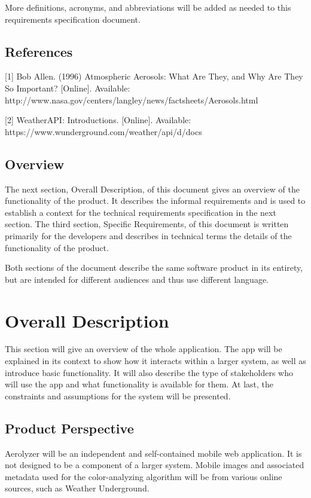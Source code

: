 \documentclass[letterpaper,10pt,draftclsnofoot,onecolumn]{IEEEtran}
\begin{document}
\begin{flushleft}
More definitions, acronyms, and abbreviations will be added as needed to this requirements specification document.
\subsection{References}
[1] Bob Allen. (1996) Atmospheric Aerosols: What Are They, and Why Are They So Important? [Online]. Available: http://www.nasa.gov/centers/langley/news/factsheets/Aerosols.html

[2] WeatherAPI: Introductions. [Online]. Available: https://www.wunderground.com/weather/api/d/docs

\subsection{Overview}
The next section, Overall Description, of this document gives an overview of the functionality of the product.
It describes the informal requirements and is used to establish a context for the technical requirements specification in the next section.
The third section, Specific Requirements, of this document is written primarily for the developers and describes in technical terms the details of the functionality of the product.

Both sections of the document describe the same software product in its entirety, but are intended for different audiences and thus use different language.

\section{Overall Description}
This section will give an overview of the whole application.
The app will be explained in its context to show how it interacts within a larger system, as well as introduce basic functionality.
It will also describe the type of stakeholders who will use the app and what functionality is available for them.
At last, the constraints and assumptions for the system will be presented.

\subsection{Product Perspective}
Aerolyzer will be an independent and self-contained mobile web application.
It is not designed to be a component of a larger system.
Mobile images and associated metadata used for the color-analyzing algorithm will be from various online sources, such as Weather Underground.


\end{flushleft}
\end{document}
